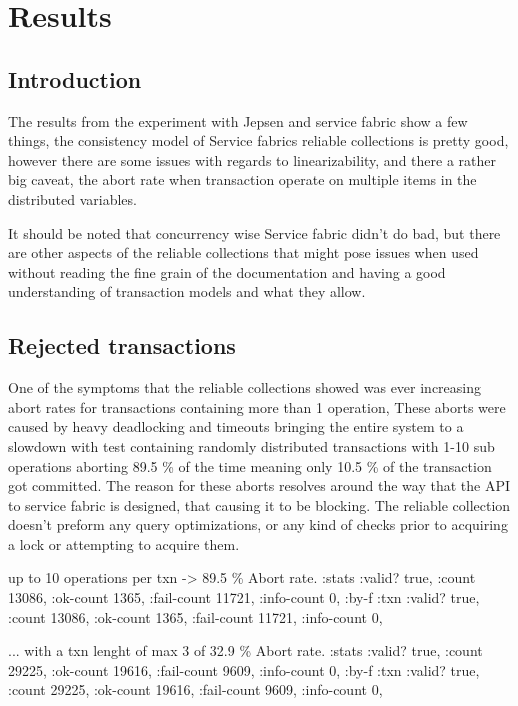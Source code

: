 \documentclass[a4paper,10pt,titlepage]{report}
\begin{document}
    \section{Results}

    \subsection{Introduction}

    The results from the experiment with Jepsen and service fabric show a few things, the consistency model of Service fabrics reliable collections is pretty good, however there are some issues with regards to linearizability, and there a rather big caveat, the abort rate when transaction operate on multiple items in the distributed variables.
    
    It should be noted that concurrency wise Service fabric didn't do bad, but there are other aspects of the reliable collections that might pose issues when used without reading the fine grain of the documentation and having a good understanding of transaction models and what they allow.
    
    \subsection{Rejected transactions}
    
    One of the symptoms that the reliable collections showed was ever increasing abort rates for transactions containing more than 1 operation, These aborts were caused by heavy deadlocking and timeouts bringing the entire system to a slowdown with test containing randomly distributed transactions with 1-10 sub operations aborting 89.5 \% of the time meaning only 10.5 \% of the transaction got committed. The reason for these aborts resolves around the way that the API to service fabric is designed, that causing it to be blocking. The reliable collection doesn't preform any query optimizations, or any kind of checks prior to acquiring a lock or attempting to acquire them. 


    up to 10 operations per txn -> 89.5 \% Abort rate.
    :stats {:valid? true,
         :count 13086,
         :ok-count 1365,
         :fail-count 11721,
         :info-count 0,
         :by-f {:txn {:valid? true,
                      :count 13086,
                      :ok-count 1365,
                      :fail-count 11721,
                      :info-count 0}}},
                      
    ...
    with a txn lenght of max 3 of 32.9 \% Abort rate.
     :stats {:valid? true,
         :count 29225,
         :ok-count 19616,
         :fail-count 9609,
         :info-count 0,
         :by-f {:txn {:valid? true,
                      :count 29225,
                      :ok-count 19616,
                      :fail-count 9609,
                      :info-count 0}}},
                      
\end{document}
